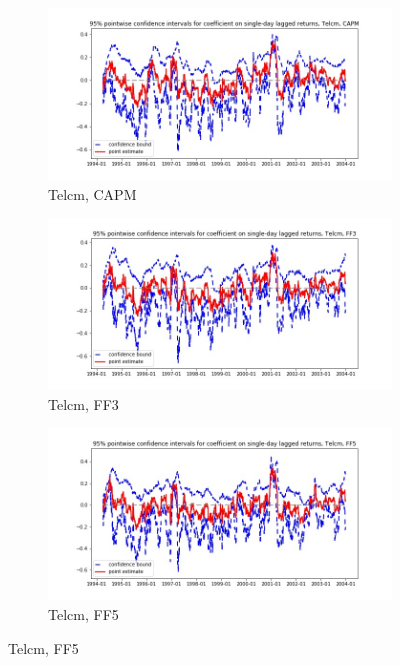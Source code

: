 \documentclass{article}
\begin{document}
\begin{landscape}
  \newpage
  
  \begin{figure}
  \centering
  \begin{subfigure}[b]{0.4\paperwidth}
    \centering
    \includegraphics[width=\textwidth]{Telcm/bwunif_pointwiseCIs_CAPM.jpg}
    \caption{Telcm, CAPM}
    \label{fig:1}
  \end{subfigure}
  \begin{subfigure}[b]{0.4\paperwidth}
    \centering
    \includegraphics[width=\textwidth]{Telcm/bwunif_pointwiseCIs_FF3.jpg}
    \caption{Telcm, FF3}
    \label{fig:2}
  \end{subfigure}
    \begin{subfigure}[b]{0.4\paperwidth}
    \centering
    \includegraphics[width=\textwidth]{Telcm/bwunif_pointwiseCIs_FF5.jpg}
    \caption{Telcm, FF5}
    \label{fig:1}
  \end{subfigure}
 \end{figure}
  

\end{landscape}
\end{document}
